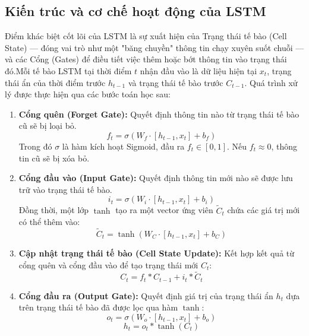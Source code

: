 \subsection{Kiến trúc và cơ chế hoạt động của LSTM}Điểm khác biệt cốt lõi của LSTM là sự xuất hiện của Trạng thái tế bào (Cell State) — đóng vai trò như một "băng chuyền" thông tin chạy xuyên suốt chuỗi — và các Cổng (Gates) để điều tiết việc thêm hoặc bớt thông tin vào trạng thái đó.Mỗi tế bào LSTM tại thời điểm $t$ nhận đầu vào là dữ liệu hiện tại $x_t$, trạng thái ẩn của thời điểm trước $h_{t-1}$ và trạng thái tế bào trước $C_{t-1}$. Quá trình xử lý được thực hiện qua các bước toán học sau:
\begin{enumerate}
\item \textbf{Cổng quên (Forget Gate):} Quyết định thông tin nào từ trạng thái tế bào cũ sẽ bị loại bỏ.
\begin{equation}
    f_t = \sigma(W_f \cdot [h_{t-1}, x_t] + b_f)
\end{equation}
Trong đó $\sigma$ là hàm kích hoạt Sigmoid, đầu ra $f_t \in [0, 1]$. Nếu $f_t \approx 0$, thông tin cũ sẽ bị xóa bỏ.

\item \textbf{Cổng đầu vào (Input Gate):} Quyết định thông tin mới nào sẽ được lưu trữ vào trạng thái tế bào.
\begin{equation}
    i_t = \sigma(W_i \cdot [h_{t-1}, x_t] + b_i)
\end{equation}
Đồng thời, một lớp $\tanh$ tạo ra một vector ứng viên $\tilde{C}_t$ chứa các giá trị mới có thể thêm vào:
\begin{equation}
    \tilde{C}_t = \tanh(W_C \cdot [h_{t-1}, x_t] + b_C)
\end{equation}

\item \textbf{Cập nhật trạng thái tế bào (Cell State Update):} Kết hợp kết quả từ cổng quên và cổng đầu vào để tạo trạng thái mới $C_t$:
\begin{equation}
    C_t = f_t * C_{t-1} + i_t * \tilde{C}_t
\end{equation}

\item \textbf{Cổng đầu ra (Output Gate):} Quyết định giá trị của trạng thái ẩn $h_t$ dựa trên trạng thái tế bào đã được lọc qua hàm $\tanh$:
\begin{equation}
    o_t = \sigma(W_o \cdot [h_{t-1}, x_t] + b_o)
\end{equation}
\begin{equation}
    h_t = o_t * \tanh(C_t)
\end{equation}
\end{enumerate}


